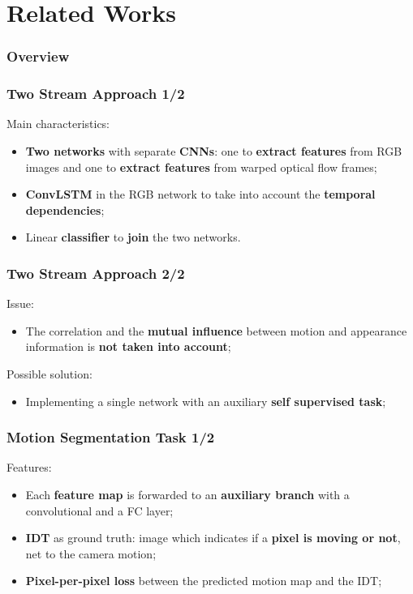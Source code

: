 \documentclass{beamer}
\begin{document}
\section{Related Works}

\begin{frame}
\frametitle{Overview} 
  \tableofcontents[currentsection]
\end{frame}

\begin{frame}
\frametitle{Two Stream Approach 1/2}
Main characteristics:
\begin{itemize}
\item \textbf{Two networks} with separate \textbf{CNNs}: one to \textbf{extract features} from RGB images and one to \textbf{extract features} from warped optical flow frames;
\item \textbf{ConvLSTM} in the RGB network to take into account the \textbf{temporal dependencies};
\item Linear \textbf{classifier} to \textbf{join} the two networks.
\end{itemize}
\end{frame}

\begin{frame}
\frametitle{Two Stream Approach 2/2}
Issue:
\begin{itemize}
\item The correlation and the \textbf{mutual influence} between motion and appearance information is \textbf{not taken into account};
\end{itemize}
Possible solution:
\begin{itemize}
\item Implementing a single network with an auxiliary \textbf{self supervised task};
\end{itemize}
\end{frame}

\begin{frame}
\frametitle{Motion Segmentation Task 1/2}

Features:
\begin{itemize}
\item Each \textbf{feature map} is forwarded to an \textbf{auxiliary branch} with a convolutional and a FC layer;
\item \textbf{IDT} as ground truth: image which indicates if a \textbf{pixel is moving or not}, net to the camera motion;
\item \textbf{Pixel-per-pixel loss} between the predicted motion map and the IDT;
\end{itemize}

\end{frame}
\end{document}
